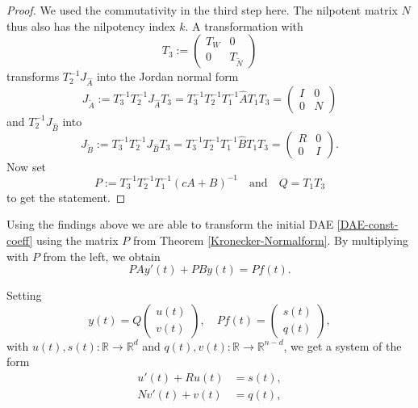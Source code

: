 \begin{proof}
	We used the commutativity in the third step here. The nilpotent matrix $N$ thus also has the nilpotency index $k$. A transformation with
	\begin{displaymath}
		T_3 := 
		\left(
		\begin{matrix}
			T_W & 0 \\
			0 & T_{\tilde{N}}
		\end{matrix}
		\right)
	\end{displaymath}
	transforms $T_2^{-1}J_{\hat{A}}$ into the Jordan normal form
	\begin{displaymath}
		J_{\tilde{A}} := T_3^{-1}T_2^{-1}J_{\hat{A}}T_3 = T_3^{-1}T_2^{-1}T_1^{-1}\hat{A}T_1T_3 = 
		\left(
		\begin{matrix}
			I & 0 \\
			0 & N
		\end{matrix}
		\right)
	\end{displaymath}
	and $T_2^{-1}J_{\hat{B}}$ into
	\begin{displaymath}
		J_{\tilde{B}} := T_3^{-1}T_2^{-1}J_{\hat{B}}T_3 = T_3^{-1}T_2^{-1}T_1^{-1}\hat{B}T_1T_3 = 
		\left(
		\begin{matrix}
			R & 0 \\
			0 & I
		\end{matrix}
		\right) .
	\end{displaymath}
	Now set
	\begin{displaymath}
		P:= T_3^{-1}T_2^{-1}T_1^{-1}(cA+B)^{-1} \quad \text{and} \quad Q = T_1T_3
	\end{displaymath}
	to get the statement.
\end{proof}

Using the findings above we are able to transform the initial DAE \eqref{DAE-const-coeff} using the matrix $P$ from Theorem \ref{Kronecker-Normalform}. By multiplying with $P$ from the left, we obtain
\begin{displaymath}
	P A y'(t) + P B y(t) = P f(t) .
\end{displaymath}

Setting
\begin{displaymath}
	y(t) = Q
	\left(
	\begin{matrix}
		u(t) \\
		v(t)
	\end{matrix}  
	\right) 
	, \quad
	Pf(t) = 
	\left(
	\begin{matrix}
		s(t) \\
		q(t)
	\end{matrix}
	\right),
\end{displaymath}
with $u(t),s(t) : \mathbb{R} \to \mathbb{R}^d$ and $q(t),v(t) : \mathbb{R} \to \mathbb{R}^{n-d}$, we get a system of the form
\begin{equation}
	\label{transformed-DAE-const-coeff}
	\begin{aligned}
		u'(t) + Ru(t) &= s(t), \\
		Nv'(t) + v(t) &= q(t),
	\end{aligned}
\end{equation}

